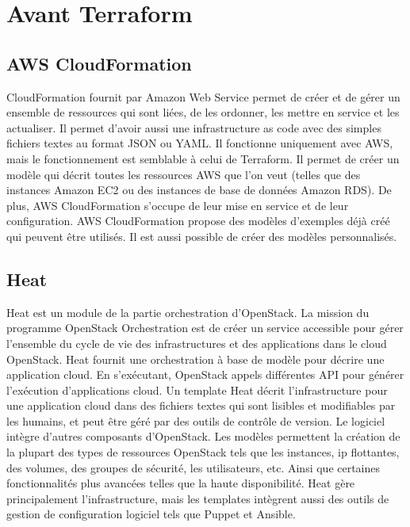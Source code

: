 \documentclass[]{article}
\begin{document}
\newpage
\section{Avant Terraform}\label{avant-terraform}

\subsection{AWS CloudFormation}\label{aws-cloudformation}

CloudFormation fournit par Amazon Web Service permet de créer et de
gérer un ensemble de ressources qui sont liées, de les ordonner, les
mettre en service et les actualiser. Il permet d'avoir
aussi une infrastructure as code avec des simples fichiers textes au
format JSON ou YAML. Il fonctionne uniquement avec AWS, mais le
fonctionnement est semblable à celui de  Terraform. Il permet de créer un modèle qui
décrit toutes les ressources AWS que l'on veut (telles que des instances
Amazon EC2 ou des instances de base de données Amazon RDS). De plus, AWS
CloudFormation s'occupe de leur mise en service et de leur
configuration. AWS CloudFormation propose des modèles d'exemples déjà
créé qui peuvent être utilisés. Il est aussi possible de créer des
modèles personnalisés.

\subsection{Heat}\label{heat}

Heat est un module de la partie orchestration d'OpenStack. La mission du
programme OpenStack Orchestration est de créer un service accessible
pour gérer l'ensemble du cycle de vie des infrastructures et des
applications dans le cloud OpenStack. Heat fournit une orchestration à
base de modèle pour décrire une application cloud. En s'exécutant,
OpenStack appels différentes API pour générer l'exécution d'applications
cloud. Un template Heat décrit l'infrastructure pour une application
cloud dans des fichiers textes qui sont lisibles et modifiables par les
humains, et peut être géré par des outils de contrôle de version. Le
logiciel intègre d'autres composants d'OpenStack. Les modèles permettent
la création de la plupart des types de ressources OpenStack tels que les
instances, ip flottantes, des volumes, des groupes de sécurité, les
utilisateurs, etc. Ainsi que certaines fonctionnalités plus avancées
telles que la haute disponibilité. Heat gère principalement
l'infrastructure, mais les templates intègrent aussi des outils de
gestion de configuration logiciel tels que Puppet et Ansible.
\end{document}
